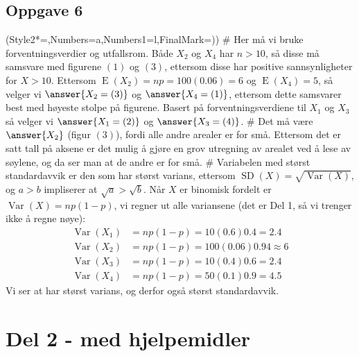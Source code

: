\subsection*{Oppgave 6}
\begin{easylist}[enumerate]
\ListProperties(Style2*=,Numbers=a,Numbers1=l,FinalMark={)})
# Her må vi bruke forventningsverdier og utfallsrom. Både $X_2$ og $X_4$ har $n > 10$, så disse må samsvare med figurene $(1)$ og $(3)$, ettersom disse har positive sannsynligheter for $X > 10$.
Ettersom $\operatorname{E}(X_2) = np = 100(0.06) = 6$ og $\operatorname{E}(X_4) = 5$, så velger vi $\answer{X_2 = (3)}$ og $\answer{X_4 = (1)}$,
ettersom dette samsvarer best med høyeste stolpe på figurene.
Basert på forventningsverdiene til $X_1$ og $X_3$ så velger vi $\answer{X_1 = (2)}$ og $\answer{X_3 = (4)}$.
# Det må være $\answer{X_2}$ (figur $(3)$), fordi alle andre arealer er for små.
Ettersom det er satt tall på aksene er det mulig å gjøre en grov utregning av arealet ved å lese av søylene, og da ser man at de andre er for små.
# Variabelen med størst standardavvik er den som har størst varians, ettersom
$\operatorname{SD}(X) = \sqrt{\operatorname{Var}(X)}$, og $a > b$ impliserer at $\sqrt{a} > \sqrt{b}$.
Når $X$ er binomisk fordelt er $\operatorname{Var}(X) = np(1-p)$, vi regner ut alle variansene (det er Del 1, så vi trenger ikke å regne nøye):
\begin{align*}
\operatorname{Var}(X_1) &= np(1-p) = 10 (0.6) 0.4 = 2.4 \\ 
\operatorname{Var}(X_2) &= np(1-p) = 100 (0.06) 0.94 \approx 6 \\
\operatorname{Var}(X_3) &= np(1-p) = 10 (0.4) 0.6 = 2.4 \\
\operatorname{Var}(X_4) &= np(1-p) = 50 (0.1) 0.9 = 4.5
\end{align*}
Vi ser at   har størst varians, og derfor også størst standardavvik.
\end{easylist}




\section*{Del 2 - med hjelpemidler}

